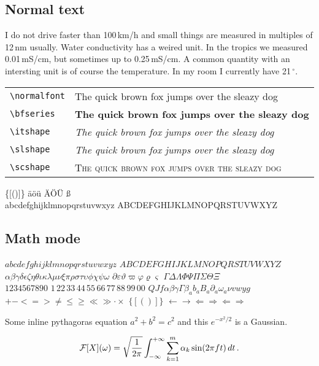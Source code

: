 \subsection{Normal text}

I do not drive faster than 100\,km/h and small things are measured in
multiples of 12\,nm usually. Water conductivity has a weired unit. In
the tropics we measured 0.01\,mS/cm, but sometimes up to
0.25\,mS/cm. A common quantity with an intersting unit is of course
the temperature. In my room I currently have 21\,$^{\circ}$.

\bigskip
\noindent
\begin{tabular}{@{}ll}
  \texttt{\textbackslash normalfont} & The quick brown fox jumps over the sleazy dog \\
  \texttt{\textbackslash bfseries} & \textbf{The quick brown fox jumps over the sleazy dog} \\
  \texttt{\textbackslash itshape} & \textit{The quick brown fox jumps over the sleazy dog} \\
  \texttt{\textbackslash slshape} & \textsl{The quick brown fox jumps over the sleazy dog} \\
  \texttt{\textbackslash scshape} & \textsc{The quick brown fox jumps over the sleazy dog}
\end{tabular}

\bigskip
{} \qquad \{[()]\} \qquad \"a\"o\"u  \"A\"O\"U {\ss} \\
abcdefghijklmnopqrstuvwxyz \qquad ABCDEFGHIJKLMNOPQRSTUVWXYZ

\subsection{Math mode}

$abcdefghijklmnopqrstuvwxyz$ \qquad
$ABCDEFGHIJKLMNOPQRSTUVWXYZ$\\
$\alpha\beta\gamma\delta\epsilon\zeta\eta\theta\iota\kappa\lambda\mu\nu\xi\pi\rho\sigma\tau\upsilon\phi\chi\psi\omega$ \qquad
$\partial\varepsilon\vartheta\varpi\varphi\varrho\varsigma$ \qquad
$\Gamma\Delta\Lambda\Phi\Psi\Pi\Sigma\Theta\Xi$\\
$1234567890$ $1$\,2$2$\,3$3$\,4$4$\,5$5$\,6$6$\,7$7$\,8$8$\,9$9$\,0$0$ \qquad
$QJf \alpha \beta \gamma \Gamma \beta_a b_a B_a \partial_a \omega_a \nu vwyg$ \\
$+ - <=> \ne \le \ge \ll \gg \cdot \times$ \qquad
$\{[()]\}$ \qquad
$\leftarrow \rightarrow \Leftarrow \Rightarrow \Longleftarrow \Longrightarrow$

\bigskip
\noindent
Some inline pythagoras equation $a^2 + b^2 = c^2$ and this $e^{-x^2/2}$ is a Gaussian.

\[ {\cal F}[X](\omega) = \sqrt{\frac{1}{2\pi}}\int_{-\infty}^{+\infty} \sum_{k=1}^m \alpha_k\sin(2\pi f t)\,dt\,. \]
